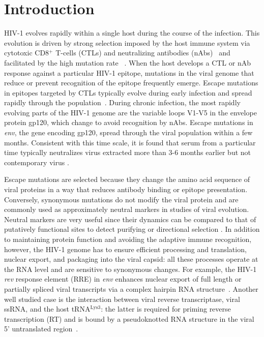 \documentclass[rmp, twocolumn]{revtex4}
\newcommand{\rev}{\textit{rev}}
\newcommand{\env}{\textit{env}}
\begin{document}
\section{Introduction}
HIV-1 evolves rapidly within a single host during the course of the infection.
This evolution is driven by strong selection imposed by the host immune system
via cytotoxic CD8${}^+$ T-cells (CTLs) and neutralizing antibodies
(nAbs)~\citep{rambaut_causes_2004} and facilitated by the high mutation rate
~\citep{mansky_lower_1995,abram_nature_2010}. When the host develops a CTL or
nAb response against a particular HIV-1 epitope, mutations in the viral genome that
reduce or prevent recognition of the epitope frequently emerge. Escape mutations
in epitopes targeted by CTLs typically evolve during early infection and spread
rapidly through the population~\citep{mcmichael_immune_2009}. During chronic
infection, the most rapidly evolving parts of the HIV-1 genome are the variable
loops V1-V5 in the envelope protein gp120, which change to avoid recognition by
nAbs. Escape mutations in \env, the gene encoding gp120, spread through the
viral population within a few months.
Consistent with this time scale, it is found that serum from a particular time
typically neutralizes virus extracted more than 3-6 months earlier but not contemporary
virus \citep{richman_rapid_2003}.

Escape mutations are selected because they change the amino acid sequence of
viral proteins in a way that reduces antibody binding or epitope presentation.
Conversely, synonymous mutations do not modify the viral protein and are
commonly used as approximately neutral markers in studies of viral evolution.
Neutral markers are very useful since their dynamics can be compared to that of
putatively functional sites to detect purifying or directional selection
\citep{Bhatt:2011p43255,Hurst:2002p32608,Chen:2004p22606}. In addition to
maintaining protein function and avoiding the adaptive immune recognition,
however, the HIV-1 genome has to ensure efficient processing and translation,
nuclear export, and packaging into the viral capsid: all these processes operate
at the RNA level and are sensitive to synonymous changes. For example, the HIV-1
\rev{} response element (RRE) in \env{} enhances nuclear export of full length
or partially spliced viral transcripts via a complex hairpin RNA
structure~\citep{fernandes_hiv-1_2012}. Another well studied case is the
interaction between viral reverse transcriptase, viral ssRNA, and the host
tRNA$^\text{Lys3}$: the latter is required for priming reverse transcription
(RT) and is bound by a pseudoknotted RNA structure in the viral 5' untranslated
region~\citep{barat_interaction_1991, paillart_vitro_2002}.
\end{document}
